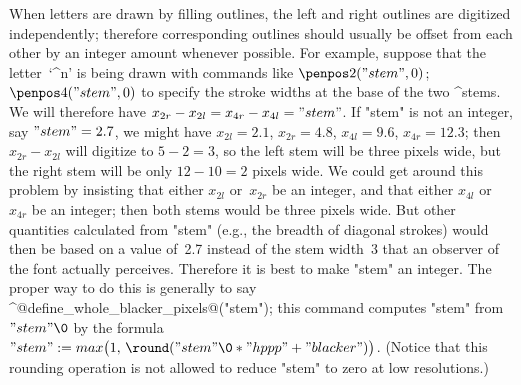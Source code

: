 \danger When letters are drawn by filling outlines, the left and right
outlines are digitized independently; therefore corresponding outlines
should usually be offset from each other by an integer amount whenever
possible. For example, suppose that the letter~`^{n}' is being drawn
with commands like
\begindisplay
$\penpos2("stem",0)$; \ $\penpos4("stem",0)$
\enddisplay
to specify the stroke widths at the base of the two ^{stems}.
We will therefore have $x_{2r}-x_{2l}=x_{4r}-x_{4l}="stem"$. If
"stem" is not an integer, say $"stem"=2.7$, we might have
$x_{2l}=2.1$, $x_{2r}=4.8$, $x_{4l}=9.6$, $x_{4r}=12.3$;
then $x_{2r}-x_{2l}$ will digitize to $5-2=3$, so the left stem
will be three pixels wide, but the right stem will be only
$12-10=2$ pixels wide. We could get around this problem by
insisting that either $x_{2l}$ or~$x_{2r}$ be an integer,
and that either $x_{4l}$ or~$x_{4r}$ be an integer; then both stems
would be three pixels wide. But other quantities calculated from "stem"
(e.g., the breadth of diagonal strokes) would then be based on a
value of~2.7 instead of the stem width~3 that an observer of the
font actually perceives. Therefore it is best to make "stem" an integer.
The proper way to do this is generally to say
\begindisplay
^@define\_whole\_blacker\_pixels@("stem");
\enddisplay
this command computes "stem" from $"stem"\0$ by the formula
\begindisplay
$"stem":=max\bigl(1,\,\round("stem"\0\ast"hppp"+"blacker")\bigr)$.
\enddisplay
(Notice that this rounding operation is not allowed to reduce "stem"
to zero at low resolutions.)

